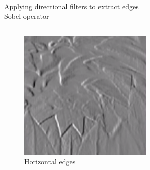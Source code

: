 \documentclass[accentcolor=tud4b,colorbacktitle,inverttitle,landscape,german,presentation,t]{tudbeamer}
\begin{document}
\begin{frame}{\\Applying directional filters to extract edges\\ \small{Sobel operator}}
\begin{columns}
\begin{figure}
\includegraphics[scale=.6]{Sobel_4_x}
\caption{Horizontal edges \cite{youtube} }
\end{figure}
\end{columns}

\end{frame}
\end{document}
